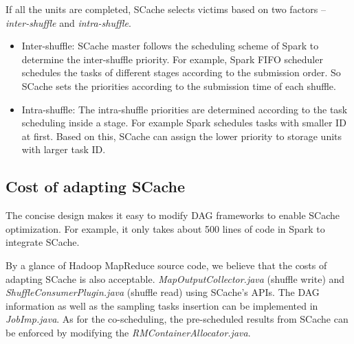 If all the units are completed, SCache selects victims based on two factors -- \textit{inter-shuffle} and \textit{intra-shuffle}.
\begin{itemize}[noitemsep]
	\item Inter-shuffle: SCache master follows the scheduling scheme of Spark to determine the inter-shuffle priority. 
	For example, Spark FIFO scheduler schedules the tasks of different stages according to the submission order. 
	So SCache sets the priorities according to the submission time of each shuffle.
	\item Intra-shuffle: The intra-shuffle priorities are determined according to the task scheduling inside a stage.
	For example Spark schedules tasks with smaller ID at first. 
	Based on this, SCache can assign the lower priority to storage units with larger task ID.
\end{itemize}

\subsection{Cost of adapting SCache}
The concise design makes it easy to modify DAG frameworks to enable SCache optimization. 
For example, it only takes about 500 lines of code in Spark to integrate SCache. 

\ifrevision
{}
\fi

By a glance of Hadoop MapReduce \cite{hadoop} source code, we believe that the costs of adapting SCache is also acceptable. 
 \textit{MapOutputCollector.java} (shuffle write) and \textit{ShuffleConsumerPlugin.java} (shuffle read) using SCache's APIs.
The DAG information as well as the sampling tasks insertion can be implemented in \textit{JobImp.java}.  
As for the co-scheduling, the pre-scheduled results from SCache can be enforced by modifying the \textit{RMContainerAllocator.java}. 

